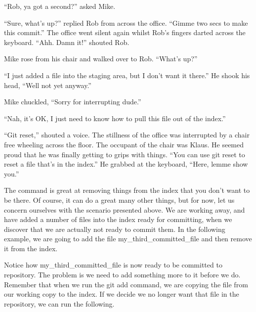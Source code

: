 \begin{trenches}
``Rob, ya got a second?'' asked Mike.

``Sure, what's up?'' replied Rob from across the office.
``Gimme two secs to make this commit.'' The office went silent again whilst Rob's fingers darted across the keyboard.
``Ahh. Damn it!'' shouted Rob.

Mike rose from his chair and walked over to Rob.
``What's up?''

``I just added a file into the staging area, but I don't want it there.''
He shook his head, ``Well not yet anyway.''

Mike chuckled, ``Sorry for interrupting dude.''

``Nah, it's OK, I just need to know how to pull this file out of the index.''

``Git reset,'' shouted a voice.
The stillness of the office was interrupted by a chair free wheeling across the floor.
The occupant of the chair was Klaus.
He seemed proud that he was finally getting to grips with things.
``You can use git reset to reset a file that's in the index.''
He grabbed at the keyboard, ``Here, lemme show you.''
\end{trenches}

The  command is great at removing things from the index that you don't want to be there.
Of course, it can do a great many other things, but for now, let us concern ourselves with the scenario presented above.
We are working away, and have added a number of files into the index ready for committing, when we discover that we are actually not ready to commit them.
In the following example, we are going to add the file my\_third\_committed\_file and then remove it from the index.


Notice how my\_third\_committed\_file is now ready to be committed to repository.
The problem is we need to add something more to it before we do.
Remember that when we run the git add command, we are copying the file from our working copy to the index.
If we decide we no longer want that file in the repository, we can run the following.

